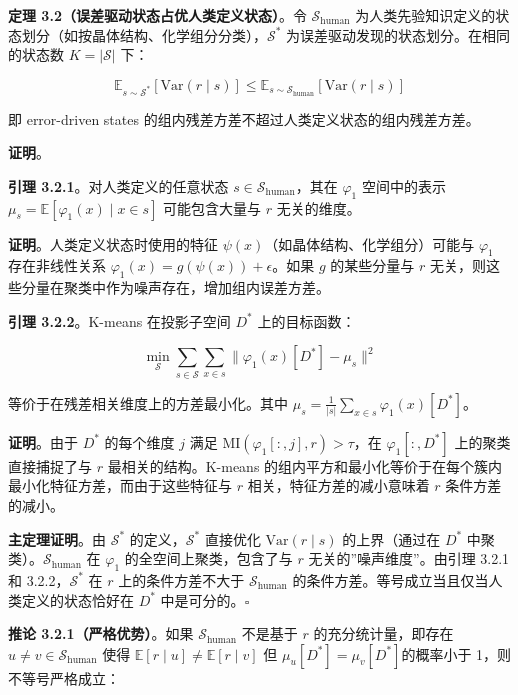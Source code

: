 \documentclass[
  12pt,
]{ctexart}
\begin{document}
\textbf{定理 3.2（误差驱动状态占优人类定义状态）}。令
\(\mathcal{S}_{\text{human}}\)
为人类先验知识定义的状态划分（如按晶体结构、化学组分分类），\(\mathcal{S}^*\)
为误差驱动发现的状态划分。在相同的状态数 \(K = |\mathcal{S}|\) 下：

\[\mathbb{E}_{s \sim \mathcal{S}^*}[\text{Var}(r \mid s)] \leq \mathbb{E}_{s \sim \mathcal{S}_{\text{human}}}[\text{Var}(r \mid s)]\]

即 error-driven states 的组内残差方差不超过人类定义状态的组内残差方差。

\textbf{证明}。

\textbf{引理 3.2.1}。对人类定义的任意状态
\(s \in \mathcal{S}_{\text{human}}\)，其在 \(\varphi_1\) 空间中的表示
\(\mu_s = \mathbb{E}[\varphi_1(x) \mid x \in s]\) 可能包含大量与 \(r\)
无关的维度。

\textbf{证明}。人类定义状态时使用的特征
\(\psi(x)\)（如晶体结构、化学组分）可能与 \(\varphi_1\) 存在非线性关系
\(\varphi_1(x) = g(\psi(x)) + \epsilon\)。如果 \(g\) 的某些分量与 \(r\)
无关，则这些分量在聚类中作为噪声存在，增加组内误差方差。

\textbf{引理 3.2.2}。K-means 在投影子空间 \(D^*\) 上的目标函数：

\[\min_{\mathcal{S}} \sum_{s \in \mathcal{S}} \sum_{x \in s} \|\varphi_1(x)[D^*] - \mu_s\|^2\]

等价于在残差相关维度上的方差最小化。其中
\(\mu_s = \frac{1}{|s|} \sum_{x \in s} \varphi_1(x)[D^*]\)。

\textbf{证明}。由于 \(D^*\) 的每个维度 \(j\) 满足
\(\text{MI}(\varphi_1[:, j], r) > \tau\)，在 \(\varphi_1[:, D^*]\)
上的聚类直接捕捉了与 \(r\) 最相关的结构。K-means
的组内平方和最小化等价于在每个簇内最小化特征方差，而由于这些特征与 \(r\)
相关，特征方差的减小意味着 \(r\) 条件方差的减小。

\textbf{主定理证明}。由 \(\mathcal{S}^*\) 的定义，\(\mathcal{S}^*\)
直接优化 \(\text{Var}(r \mid s)\) 的上界（通过在 \(D^*\)
中聚类）。\(\mathcal{S}_{\text{human}}\) 在 \(\varphi_1\)
的全空间上聚类，包含了与 \(r\) 无关的''噪声维度''。由引理 3.2.1 和
3.2.2，\(\mathcal{S}^*\) 在 \(r\) 上的条件方差不大于
\(\mathcal{S}_{\text{human}}\)
的条件方差。等号成立当且仅当人类定义的状态恰好在 \(D^*\)
中是可分的。\(\square\)

\textbf{推论 3.2.1（严格优势）}。如果 \(\mathcal{S}_{\text{human}}\)
不是基于 \(r\) 的充分统计量，即存在
\(u \neq v \in \mathcal{S}_{\text{human}}\) 使得
\(\mathbb{E}[r \mid u] \neq \mathbb{E}[r \mid v]\) 但
\(\mu_u[D^*] = \mu_v[D^*]\)的概率小于 1，则不等号严格成立：
\end{document}
